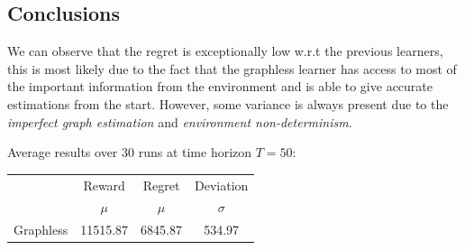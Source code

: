 \subsection{Conclusions}

We can observe that the regret is exceptionally low w.r.t the previous learners, this is most likely due to the fact that the graphless learner has access to most of the important information from the environment and is able to give accurate estimations from the start.
However, some variance is always present due to the \textit{imperfect graph estimation} and \textit{environment non-determinism}.

Average results over 30 runs at time horizon $T = 50$:

\begin{table}[h]
	\center
	\begin{tabular}{|c|cc|c|}
	\hline \hline
		\cellcolor{blue!25} & Reward 	& Regret	& Deviation \\
	\cline{2-4}
		\cellcolor{blue!25} & $\mu$		& $\mu$		& $\sigma$	\\
	\hline \hline
		Graphless			& 11515.87 	& 6845.87	& 534.97 	\\
	\hline \hline
	\end{tabular}
\end{table}
